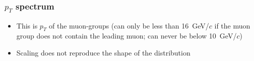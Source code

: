 \documentclass[compress]{beamer}
\begin{document}
\begin{frame}
\frametitle{$p_T$ spectrum }
\begin{itemize}
\item This is $p_T$ of the muon-groups (can only be less than
16~GeV/$c$ if the muon group does not contain the leading muon; can
never be below 10~GeV/$c$)
\item Scaling does not reproduce the shape of the distribution
\end{itemize}

\vfill
{}
\end{frame}
\end{document}
